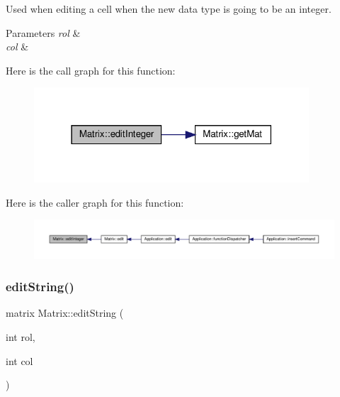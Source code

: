 Used when editing a cell when the new data type is going to be an integer. 
\begin{DoxyParams}{Parameters}
{\em rol} & \\
\hline
{\em col} & \\
\hline
\end{DoxyParams}
Here is the call graph for this function\+:\nopagebreak
\begin{figure}[H]
\begin{center}
\leavevmode
\includegraphics[width=291pt]{class_matrix_a91c66e2961a16adf56b8d58b916d2d46_cgraph}
\end{center}
\end{figure}
Here is the caller graph for this function\+:\nopagebreak
\begin{figure}[H]
\begin{center}
\leavevmode
\includegraphics[width=350pt]{class_matrix_a91c66e2961a16adf56b8d58b916d2d46_icgraph}
\end{center}
\end{figure}
\mbox{\label{class_matrix_a7029d8a3cd3c691b46adfd777abc880c}} 
\subsubsection{\texorpdfstring{edit\+String()}{editString()}}
{\footnotesize\ttfamily matrix Matrix\+::edit\+String (\begin{DoxyParamCaption}\item[{int}]{rol,  }\item[{int}]{col }\end{DoxyParamCaption})\hspace{0.3cm}{\ttfamily [private]}}

